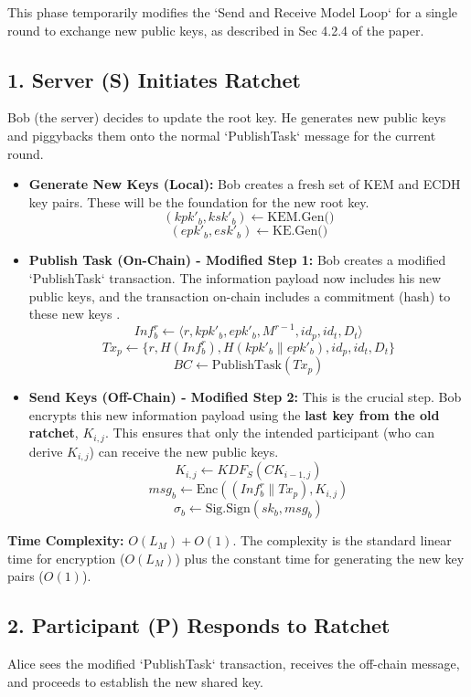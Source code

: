 \documentclass[12pt]{article}
\begin{document}
This phase temporarily modifies the `Send and Receive Model Loop` for a single round to exchange new public keys, as described in Sec 4.2.4 of the paper.



\subsection*{1. Server (S) Initiates Ratchet}
Bob (the server) decides to update the root key. He generates new public keys and piggybacks them onto the normal `PublishTask` message for the current round.

\begin{itemize}
    \item \textbf{Generate New Keys (Local):} Bob creates a fresh set of KEM and ECDH key pairs. These will be the foundation for the new root key.
    \[ (kpk'_b, ksk'_b) \leftarrow \text{KEM.Gen()} \]
    \[ (epk'_b, esk'_b) \leftarrow \text{KE.Gen()} \]
    
    \item \textbf{Publish Task (On-Chain) - Modified Step 1:} Bob creates a modified `PublishTask` transaction. The information payload now includes his new public keys, and the transaction on-chain includes a commitment (hash) to these new keys .
    \[ Inf_b^r \leftarrow \langle r, kpk'_b, epk'_b, M^{r-1}, id_p, id_t, D_t \rangle \]
    \[ Tx_p \leftarrow \{ r, H(Inf_b^r), H(kpk'_b \parallel epk'_b), id_p, id_t, D_t \} \]
    \[ BC \leftarrow \text{PublishTask}(Tx_p) \]
    
    \item \textbf{Send Keys (Off-Chain) - Modified Step 2:} This is the crucial step. Bob encrypts this new information payload using the \textbf{last key from the old ratchet}, \( K_{i,j} \). This ensures that only the intended participant (who can derive \( K_{i,j} \)) can receive the new public keys.
    \[ K_{i,j} \leftarrow KDF_S(CK_{i-1,j}) \]
    \[ msg_b \leftarrow \text{Enc}((Inf_b^r \parallel Tx_p), K_{i,j}) \]
    \[ \sigma_b \leftarrow \text{Sig.Sign}(sk_b, msg_b) \]
\end{itemize}
\textbf{Time Complexity:} \( O(L_M) + O(1) \). The complexity is the standard linear time for encryption (\( O(L_M) \)) plus the constant time for generating the new key pairs (\( O(1) \)).

\subsection*{2. Participant (P) Responds to Ratchet}
Alice sees the modified `PublishTask` transaction, receives the off-chain message, and proceeds to establish the new shared key.
\end{document}
